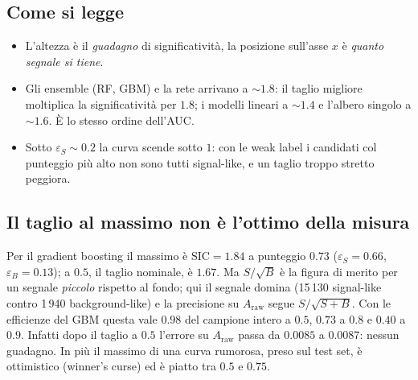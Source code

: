 \documentclass[10.5pt,a4paper]{article}
\newcommand{\Araw}{A_{\mathrm{raw}}}
\begin{document}
\subsection*{Come si legge}
\begin{itemize}
\item L'altezza è il \emph{guadagno} di significatività, la posizione sull'asse $x$ è \emph{quanto segnale si tiene}.
\item Gli ensemble (RF, GBM) e la rete arrivano a $\sim1.8$: il taglio migliore moltiplica la significatività per $1.8$; i modelli lineari
a $\sim1.4$ e l'albero singolo a $\sim1.6$. È lo stesso ordine dell'AUC.
\item Sotto $\varepsilon_S\sim0.2$ la curva scende sotto $1$: con le weak label i candidati col punteggio più alto non sono tutti
signal-like, e un taglio troppo stretto peggiora.
\end{itemize}

\subsection*{Il taglio al massimo non è l'ottimo della misura}
Per il gradient boosting il massimo è $\mathrm{SIC}=1.84$ a punteggio $0.73$ ($\varepsilon_S=0.66$, $\varepsilon_B=0.13$); a $0.5$,
il taglio nominale, è $1.67$. Ma $S/\sqrt B$ è la figura di merito per un segnale \emph{piccolo} rispetto al fondo; qui il segnale
domina (15\,130 signal-like contro 1\,940 background-like) e la precisione su $\Araw$ segue $S/\sqrt{S+B}$. Con le efficienze del
GBM questa vale $0.98$ del campione intero a $0.5$, $0.73$ a $0.8$ e $0.40$ a $0.9$. Infatti dopo il taglio a $0.5$ l'errore
su $\Araw$ passa da $0.0085$ a $0.0087$: nessun guadagno. In più il massimo di una curva rumorosa, preso sul test set, è
ottimistico (winner's curse) ed è piatto tra $0.5$ e $0.75$.
\end{document}
